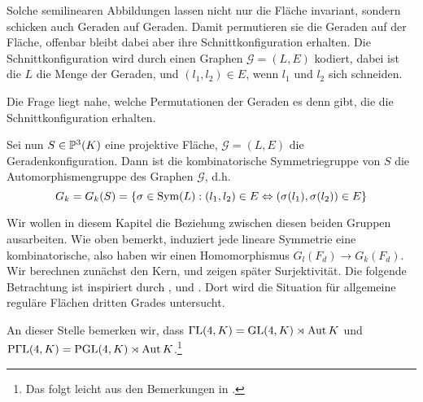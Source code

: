 Solche semilinearen Abbildungen lassen nicht nur die Fläche invariant, sondern schicken auch Geraden auf Geraden. Damit permutieren sie die Geraden auf der Fläche, offenbar bleibt dabei aber ihre Schnittkonfiguration erhalten. Die Schnittkonfiguration wird durch einen Graphen $\mathcal G = (L,E)$ kodiert, dabei ist die $L$ die Menge der Geraden, und $(l_1, l_2) \in E$, wenn $l_1$ und $l_2$ sich schneiden.

Die Frage liegt nahe, welche Permutationen der Geraden es denn gibt, die die Schnittkonfiguration erhalten.
\begin{defin}
Sei nun $S \in \mathbb P^{3}(K)$ eine projektive Fläche, $\mathcal G = (L,E)$ die Geradenkonfiguration. Dann ist die kombinatorische Symmetriegruppe von $S$ die Automorphismengruppe des Graphen $\mathcal G$, d.h.
\begin{equation}
G_k = G_k(S) = \{ \sigma \in \operatorname{Sym}(L): (l_1, l_2) \in E \Leftrightarrow (\sigma(l_1), \sigma(l_2)) \in E \}
\end{equation}
\end{defin}

Wir wollen in diesem Kapitel die Beziehung zwischen diesen beiden Gruppen ausarbeiten. Wie oben bemerkt, induziert jede lineare Symmetrie eine kombinatorische, also haben wir einen Homomorphismus $G_l(F_d) \to G_k(F_d)$. Wir berechnen zunächst den Kern, und zeigen später Surjektivität. Die folgende Betrachtung ist inspiriert durch \cite[Bem.~4.10.1, S.~404]{Hartshorne}, und \cite[Aufg. C--D, S.~180]{Mumford}. Dort wird die Situation für allgemeine reguläre Flächen dritten Grades untersucht.

An dieser Stelle bemerken wir, dass $\mathrm{\Gamma L}(4,K) = \mathrm{GL}(4,K) \rtimes \operatorname{Aut} K$ und $\mathrm{P\Gamma L}(4,K) = \mathrm{PGL}(4,K) \rtimes \operatorname{Aut} K$.\footnote{Das folgt leicht aus den Bemerkungen in \cite[S.~2--3]{Dieudonne}.}

